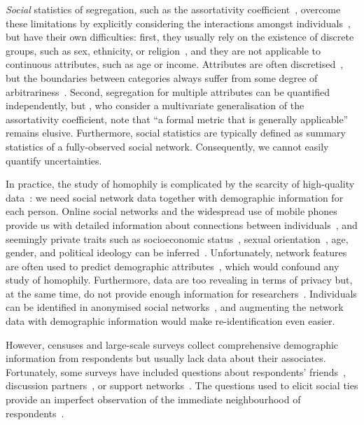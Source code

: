 \documentclass{scrartcl}
\begin{document}
\emph{Social} statistics of segregation, such as the assortativity coefficient~\cite{Newman2003a}, overcome these limitations by explicitly considering the interactions amongst individuals~\cite{Blumenstock2013}, but have their own difficulties: first, they usually rely on the existence of discrete groups, such as sex, ethnicity, or religion~\cite{Bojanowski2014}, and they are not applicable to continuous attributes, such as age or income. Attributes are often discretised~\cite{Lam-Morgan2012, Kalmijn2007, Kim2012}, but the boundaries between categories always suffer from some degree of arbitrariness~\cite{Reardon2004}. Second, segregation for multiple attributes can be quantified independently, but \textcite{Pelechrinis2016}, who consider a multivariate generalisation of the assortativity coefficient, note that ``a formal metric that is generally applicable'' remains elusive. Furthermore, social statistics are typically defined as summary statistics of a fully-observed social network. Consequently, we cannot easily quantify uncertainties.

In practice, the study of homophily is complicated by the scarcity of high-quality data~\cite{Butts2012, Blumenstock2013}: we need social network data together with demographic information for each person. Online social networks and the widespread use of mobile phones provide us with detailed information about connections between individuals~\cite{Golder2014}, and seemingly private traits such as socioeconomic status~\cite{Blumenstock2015, Luo2017}, sexual orientation~\cite{Wang2017}, age, gender, and political ideology can be inferred~\cite{Kosinski2013}. Unfortunately, network features are often used to predict demographic attributes~\cite{Wang2013,Blumenstock2015,Luo2017,Kosinski2013}, which would confound any study of homophily. Furthermore, data are too revealing in terms of privacy but, at the same time, do not provide enough information for researchers~\cite{Golder2014}. Individuals can be identified in anonymised social networks~\cite{Backstrom2011, Narayanan2008}, and augmenting the network data with demographic information would make re-identification even easier.

However, censuses and large-scale surveys collect comprehensive demographic information from respondents but usually lack data about their associates. Fortunately, some surveys have included questions about respondents' friends~\cite{Huckfeldt1983, Johnson1989}, discussion partners~\cite{Marsden1987, McPherson2006}, or support networks~\cite{Kalmijn2007, Banerjee2013}. The questions used to elicit social ties provide an imperfect observation of the immediate neighbourhood of respondents~\cite{Marin2004,Eagle2015,Eveland-Jr.2017}.
\end{document}
